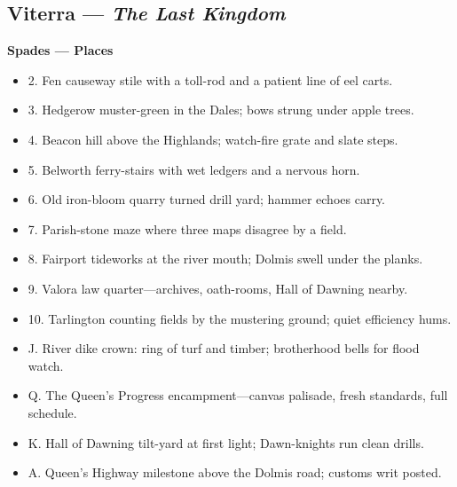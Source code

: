 \begin{multicols}{2}
\subsection*{Viterra — \textit{The Last Kingdom}}
\textbf{Spades — Places}
\begin{itemize}
  \item 2. Fen causeway stile with a toll-rod and a patient line of eel carts.
  \item 3. Hedgerow muster-green in the Dales; bows strung under apple trees.
  \item 4. Beacon hill above the Highlands; watch-fire grate and slate steps.
  \item 5. Belworth ferry-stairs with wet ledgers and a nervous horn.
  \item 6. Old iron-bloom quarry turned drill yard; hammer echoes carry.
  \item 7. Parish-stone maze where three maps disagree by a field.
  \item 8. Fairport tideworks at the river mouth; Dolmis swell under the planks.
  \item 9. Valora law quarter—archives, oath-rooms, Hall of Dawning nearby.
  \item 10. Tarlington counting fields by the mustering ground; quiet efficiency hums.
  \item J. River dike crown: ring of turf and timber; brotherhood bells for flood watch.
  \item Q. The Queen's Progress encampment—canvas palisade, fresh standards, full schedule.
  \item K. Hall of Dawning tilt-yard at first light; Dawn-knights run clean drills.
  \item A. Queen's Highway milestone above the Dolmis road; customs writ posted.
\end{itemize}


\end{multicols}
